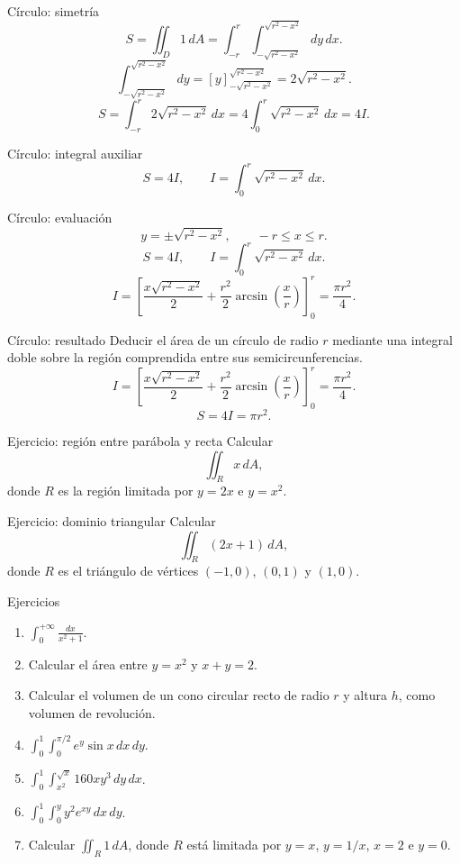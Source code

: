 \documentclass[main.tex]{subfiles}
\begin{document}
\begin{frame}{Círculo: simetría}
\small \[S=\iint_D1\,dA=\int_{-r}^r\int_{-\sqrt{r^2-x^2}}^{\sqrt{r^2-x^2}}dy\,dx.\]\[\int_{-\sqrt{r^2-x^2}}^{\sqrt{r^2-x^2}}dy=[y]_{-\sqrt{r^2-x^2}}^{\sqrt{r^2-x^2}}=2\sqrt{r^2-x^2}.\]\[S=\int_{-r}^r2\sqrt{r^2-x^2}\,dx=4\int_0^r\sqrt{r^2-x^2}\,dx=4I.\]
\end{frame}

\begin{frame}{Círculo: integral auxiliar}
\[S=4I,\qquad I=\int_0^r\sqrt{r^2-x^2}\,dx.\]
\end{frame}

\begin{frame}{Círculo: evaluación}
\small \[y=\pm\sqrt{r^2-x^2},\qquad -r\le x\le r.\]\[S=4I,\qquad I=\int_0^r\sqrt{r^2-x^2}\,dx.\]\[I=\left[\frac{x\sqrt{r^2-x^2}}2+\frac{r^2}{2}\arcsin\!\left(\frac xr\right)\right]_0^r=\frac{\pi r^2}{4}.\]
\end{frame}

\begin{frame}{Círculo: resultado}
\small Deducir el área de un círculo de radio $r$ mediante una integral doble sobre la región comprendida entre sus semicircunferencias.\[I=\left[\frac{x\sqrt{r^2-x^2}}2+\frac{r^2}{2}\arcsin\!\left(\frac xr\right)\right]_0^r=\frac{\pi r^2}{4}.\]\[\boxed{S=4I=\pi r^2.}\]
\end{frame}

\begin{frame}{Ejercicio: región entre parábola y recta}
Calcular\[\iint_R x\,dA,\]donde $R$ es la región limitada por $y=2x$ e $y=x^2$.
\end{frame}

\begin{frame}{Ejercicio: dominio triangular}
Calcular\[\iint_R(2x+1)\,dA,\]donde $R$ es el triángulo de vértices $(-1,0)$, $(0,1)$ y $(1,0)$.
\end{frame}

\begin{frame}{Ejercicios}
\footnotesize\begin{enumerate}\item $\displaystyle\int_0^{+\infty}\frac{dx}{x^2+1}$.\item Calcular el área entre $y=x^2$ y $x+y=2$.\item Calcular el volumen de un cono circular recto de radio $r$ y altura $h$, como volumen de revolución.\item $\displaystyle\int_0^1\int_0^{\pi/2}e^y\sin x\,dx\,dy$.\item $\displaystyle\int_0^1\int_{x^2}^{\sqrt x}160xy^3\,dy\,dx$.\item $\displaystyle\int_0^1\int_0^y y^2e^{xy}\,dx\,dy$.\item Calcular $\displaystyle\iint_R1\,dA$, donde $R$ está limitada por $y=x$, $y=1/x$, $x=2$ e $y=0$.\end{enumerate}
\end{frame}
\end{document}
